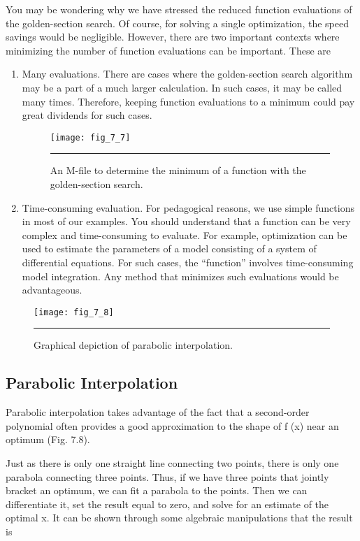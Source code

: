 \documentclass[../main.tex]{subfiles}
\begin{document}
You may be wondering why we have stressed the reduced function evaluations of the
golden-section search. Of course, for solving a single optimization, the speed savings
would be negligible. However, there are two important contexts where minimizing the
number of function evaluations can be important. These are
\begin{enumerate}
	\item Many evaluations. There are cases where the golden-section search algorithm may be a
	part of a much larger calculation. In such cases, it may be called many times. Therefore,
	keeping function evaluations to a minimum could pay great dividends for such cases.
	
	\begin{figure}[H]
		\centering
		\texttt{[image: fig\_7\_7]}
		\caption{\textsf{An M-file to determine the minimum of a function with the golden-section search.}}
		\color{cyan} \rule{\linewidth}{0,5mm}
		\label{fig:fig_7_7}
	\end{figure}

	\item Time-consuming evaluation. For pedagogical reasons, we use simple functions in
	most of our examples. You should understand that a function can be very complex
	and time-consuming to evaluate. For example, optimization can be used to estimate
	the parameters of a model consisting of a system of differential equations. For such
	cases, the ``function'' involves time-consuming model integration. Any method that
	minimizes such evaluations would be advantageous.
\end{enumerate}

\begin{figure}[H]
	\centering
	\texttt{[image: fig\_7\_8]}
	\caption{\textsf{Graphical depiction of parabolic interpolation.}}
	\color{cyan} \rule{\linewidth}{0,5mm}
	\label{fig:fig_7_8}
\end{figure}

\subsection{Parabolic Interpolation}

\noindent Parabolic interpolation takes advantage of the fact that a second-order polynomial often
provides a good approximation to the shape of f (x) near an optimum (Fig. 7.8).

Just as there is only one straight line connecting two points, there is only one parabola
connecting three points. Thus, if we have three points that jointly bracket an optimum, we
can fit a parabola to the points. Then we can differentiate it, set the result equal to zero, and
solve for an estimate of the optimal x. It can be shown through some algebraic manipulations
that the result is
\end{document}
